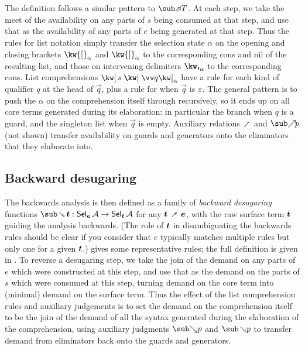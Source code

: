 The definition follows a similar pattern to $\evalFwdF{T}$. At each step, we take the meet of the availability on any parts of $s$ being consumed at that step, and use that as the availability of any parts of $e$ being generated at that step. Thus the rules for list notation simply transfer the selection state $\alpha$ on the opening and closing brackets $\annot{\kw{[}}{\alpha}$ and $\annot{\kw{]}}{\alpha}$ to the corresponding cons and nil of the resulting list, and those on intervening delimiters $\annot{\comma}{\alpha}$ to the corresponding cons. List comprehensions $\annListComp{s}{\vec{q}}{\alpha}$ have a rule for each kind of qualifier $q$ at the head of $\vec{q}$, plus a rule for when $\vec{q}$ is $\varepsilon$. The general pattern is to push the $\alpha$ on the comprehension itself through recursively, so it ends up on all core terms generated during its elaboration: in particular the  branch when $q$ is a guard, and the singleton list when $\vec{q}$ is empty. Auxiliary relations $\clauseFwdR$ and $\totaliseFwdR{p}$ (not shown) transfer availability on guards and generators onto the eliminators that they elaborate into.

\subsection{Backward desugaring}

The backwards analysis is then defined as a family of \textit{backward desugaring} functions $\desugarBwdR{\raw{t}}: \Sel{\raw{e}}{A} \to \Sel{\raw{t}}{A}$ for any $\raw{t} \desugarFwdR \raw{e}$, with the raw surface term $\bm{t}$ guiding the analysis backwards. (The role of $\bm{t}$ in disambiguating the backwards rules should be clear if you consider that $e$ typically matches multiple rules but only one for a given $\bm{t}$.)  gives some representative rules; the full definition is {\ifappendices given in  \else \IncludedWithSupplementaryMaterial.\fi} To reverse a desugaring step, we take the join of the demand on any parts of $e$ which were constructed at this step, and use that as the demand on the parts of $s$ which were consumed at this step, turning demand on the core term into (minimal) demand on the surface term. Thus the effect of the list comprehension rules and auxiliary judgements is to set the demand on the comprehension itself to be the join of the demand of all the syntax generated during the elaboration of the comprehension, using auxiliary judgments $\totaliseBwdR{p}$ and $\clauseBwdR{p}$ to transfer demand from eliminators back onto the guards and generators.

